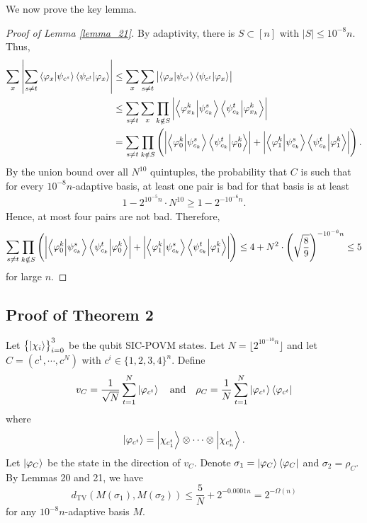 We now prove the key lemma.
\begin{proof}[Proof of Lemma \ref{lemma_21}]
By adaptivity, there is $S\subset[n]$ with $|S|\le10^{-8}n$.
Thus,
\begin{align*}
\sum_{x}\left|\sum_{s\neq t}\bra{\varphi_x}\ket{\psi_{c^s}}\bra{\psi_{c^t}}\ket{\varphi_{x}}\right|
&\le\sum_{x}\sum_{s\neq t}\left|\bra{\varphi_x}\ket{\psi_{c^s}}\bra{\psi_{c^t}}\ket{\varphi_{x}}\right|\\
&\le\sum_{s\neq t}\sum_{x}\prod_{k\notin S}\left|\bra{\varphi_{x_k}^k}\ket{\psi^s_{{c_k}}}\bra{\psi^t_{{c_k}}}\ket{\varphi^k_{x_{k}}}\right|\\
&=\sum_{s\neq t}\prod_{k\notin S}\left(\left|\bra{\varphi_{0}^k}\ket{\psi^s_{{c_k}}}\bra{\psi^t_{{c_k}}}\ket{\varphi^k_{0}}\right|+\left|\bra{\varphi_{1}^k}\ket{\psi^s_{{c_k}}}\bra{\psi^t_{{c_k}}}\ket{\varphi^k_{1}}\right|\right).
\end{align*}
By the union bound over all $N^{10}$ quintuples, the probability that $C$ is such that for every $10^{-8}n$-adaptive basis, at least one pair is bad for that basis is at least
\begin{align*}
1-2^{10^{-5}n}\cdot N^{10}\ge1-2^{-10^{-6}n}.
\end{align*}
Hence, at most four pairs are not bad.
Therefore,
\begin{align*}
\sum_{s\neq t}\prod_{k\notin S}\left(\left|\bra{\varphi_{0}^k}\ket{\psi^s_{{c_k}}}\bra{\psi^t_{{c_k}}}\ket{\varphi^k_{0}}\right|+\left|\bra{\varphi_{1}^k}\ket{\psi^s_{{c_k}}}\bra{\psi^t_{{c_k}}}\ket{\varphi^k_{1}}\right|\right)\le4+N^2\cdot\left(\sqrt{\frac{8}{9}}\right)^{-10^{-6}n}\le5
\end{align*}
for large $n$.
\end{proof}
























\subsection{Proof of Theorem 2}
Let $\left\{\ket{\chi_i}\right\}_{i=0}^3$ be the qubit SIC-POVM states.
Let $N=\lfloor 2^{10^{-10}n}\rfloor$ and let $C=\left(c^1,\cdots,c^N\right)$ with $c^i\in\{1,2,3,4\}^n$.
Define
\[
	v_C=\frac{1}{\sqrt{N}}\sum_{t=1}^N\ket{\varphi_{c^t}}\quad\text{and}\quad\rho_C=\frac{1}{N}\sum_{t=1}^N\ket{\varphi_{c^t}}\bra{\varphi_{c^t}}
\]
where
\[
	\ket{\varphi_{c^t}}=\ket{\chi_{c^t_1}}\otimes\cdots\otimes\ket{\chi_{c^t_n}}.
\]
Let $\ket{\varphi_C}$ be the state in the direction of $v_C$.
Denote $\sigma_1=\ket{\varphi_C}\bra{\varphi_C}$ and $\sigma_2=\rho_C$.
By Lemmas 20 and 21, we have
\[
	d_{\mathrm{TV}}\left(M(\sigma_1),M(\sigma_2)\right)\le\frac{5}{N}+2^{-0.0001n}=2^{-\Omega (n)}
\]
for any $10^{-8}n$-adaptive basis $M$.

